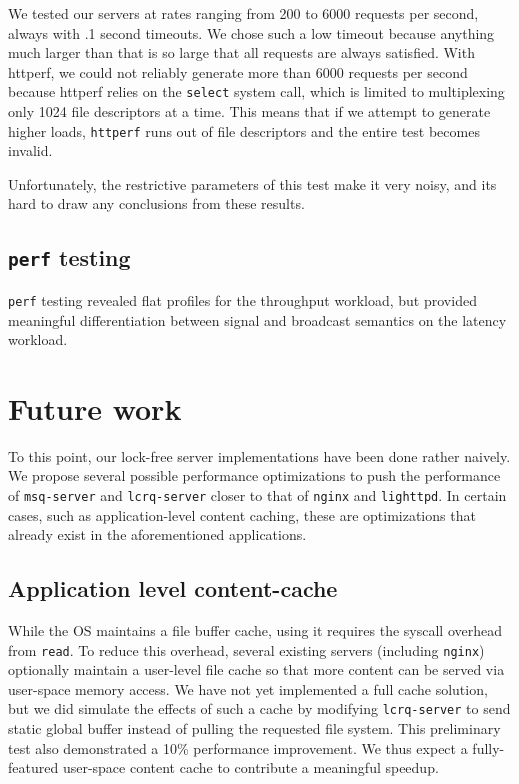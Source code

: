 \documentclass[twoside,10pt]{article}
\begin{document}
\begin{multicols}{2}
We tested our servers at rates ranging from 200 to 6000 requests per
second, always with .1 second timeouts. We chose such a low timeout
because anything much larger than that is so large that all requests
are always satisfied. With httperf, we could not reliably generate
more than 6000 requests per second because httperf relies on the
\verb+select+ system call, which is limited to multiplexing only 1024
file descriptors at a time. This means that if we attempt to generate
higher loads, \verb+httperf+ runs out of file descriptors and the
entire test becomes invalid.

Unfortunately, the restrictive parameters of this test make it very noisy, 
and its hard to draw any conclusions from these results. 

\subsection{\texttt{perf} testing}

\verb+perf+ testing revealed flat profiles for the throughput
workload, but provided meaningful differentiation between signal and
broadcast semantics on the latency workload.




\section{Future work}

To this point, our lock-free server implementations have been done
rather naively. We propose several possible performance optimizations
to push the performance of \verb+msq-server+ and \verb+lcrq-server+
closer to that of \verb+nginx+ and \verb+lighttpd+. In certain cases,
such as application-level content caching, these are optimizations
that already exist in the aforementioned applications.

\subsection{Application level content-cache}
While the OS maintains a file buffer cache, using it requires the
syscall overhead from \verb+read+. To reduce this overhead, several
existing servers (including \verb+nginx+) optionally maintain a
user-level file cache so that more content can be served via
user-space memory access. We have not yet implemented a full cache
solution, but we did simulate the effects of such a cache by modifying
\verb+lcrq-server+ to send static global buffer instead of pulling the
requested file system. This preliminary test also demonstrated a 10\%
performance improvement. We thus expect a fully-featured user-space
content cache to contribute a meaningful speedup.


\end{multicols}
\end{document}
